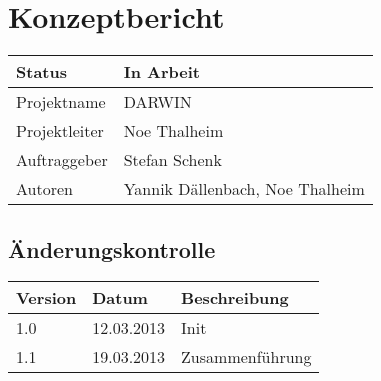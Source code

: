 \documentclass{scrartcl}
\begin{document}
	\section*{Konzeptbericht}
	
	\begin{tabularx}{\textwidth}{| X | X |}
	\hline
	Status & In Arbeit\\
	\hline
	Projektname & DARWIN\\
	\hline
	Projektleiter & Noe Thalheim\\
	\hline
	Auftraggeber & Stefan Schenk\\
	\hline
	Autoren & Yannik Dällenbach, Noe Thalheim\\
	\hline
	\end{tabularx}
	
	\subsection*{Änderungskontrolle}
	\begin{tabularx}{\textwidth}{| X | X | X |}
	\hline
	\rowcolor[gray]{0.9} Version & Datum & Beschreibung\\
	\hline
	1.0 & 12.03.2013 & Init\\
	\hline
	1.1 & 19.03.2013 & Zusammenführung\\
	\hline
	\end{tabularx}
	
	\pagebreak
	\tableofcontents
	\pagebreak
	
	
	
	
	
	
	
	
\end{document}
